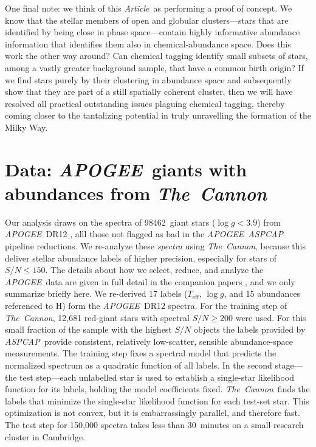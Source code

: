 \documentclass[12pt, letterpaper, preprint]{aastex}
\newcommand{\acronym}[1]{{\small{#1}}}
\newcommand{\project}[1]{\textsl{#1}}
\newcommand{\apogee}{\project{\acronym{APOGEE}}}
\newcommand{\aspcap}{\project{\acronym{ASPCAP}}}
\newcommand{\thecannon}{\project{The~Cannon}}
\newcommand{\documentname}{\textsl{Article}}
\newcommand{\teff}{T_{\mathrm{eff}}}
\newcommand{\logg}{\log g}
\newcommand{\totalnumber}{98462}
\begin{document}
One final note:
we think of this \documentname\ as performing a proof of concept.
We know that the stellar members of open and globular clusters---stars
that are identified by being close in phase space---contain highly
informative abundance information that identifies them also in
chemical-abundance space.  Does this work the other way around? 
Can chemical tagging identify small subsets of stars, among a vastly
greater background sample, that have a common birth origin? If we 
find stars purely by their clustering in abundance space and subsequently
show that they are part of a still spatially coherent cluster, then
we will have resolved all practical outstanding issues plaguing 
chemical tagging, thereby coming closer to the tantalizing potential 
in truly unravelling the formation of the Milky Way.

\section{Data: \apogee\ giants with abundances from \thecannon}\label{sec:data}

Our analysis draws on the spectra of \totalnumber\ giant stars ($\logg
< 3.9$) from \apogee\ \acronym{DR12} \citep{dr12}, alll those not
flagged as bad in the \apogee\ \aspcap\ \citep{aspcap} pipeline
reductions.
We re-analyze these \emph{spectra} using \thecannon, because this
deliver stellar abundance labels of higher precision, especially for
stars of $S/N \le 150$.
The details about how we select, reduce, and analyze the \apogee\ data
are given in full detail in the companion papers \citep{casey16,
  ness16}, and we only summarize briefly here.
We re-derived 17 labels ($\teff$, $\logg$, and 15 abundances
referenced to H) form the \apogee\ \acronym{DR12} spectra. 
For the training step of \thecannon, 
12,681 red-giant stars with spectral $S/N \ge 200$ were used.
For this small fraction of the sample with the highest $S/N$ objects the
labels provided by \aspcap\ provide consistent, relatively low-scatter, sensible
abundance-space measurements.
The training step fixes a spectral model
that predicts the normalized spectrum as a quadratic function of all
labels. In the second stage---the test step---each unlabelled star is
used to establish a single-star likelihood function for its labels,
holding the model coefficients fixed.
\thecannon\ finds the labels that minimize the single-star likelihood
function for each test-set star.
This optimization is not convex, but it is embarrassingly parallel,
and therefore fast. The test
step for 150,000 spectra takes less than 30~minutes on a small 
research cluster in Cambridge.
\end{document}
